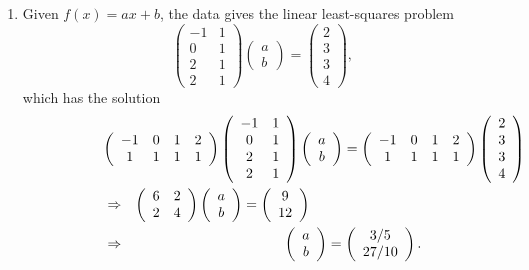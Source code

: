 \documentclass{article}
\begin{document}
\begin{enumerate}
\begin{enumerate}
\item Given \(f(x) = ax + b\), the data gives the linear least-squares problem
\[  \left( \begin{array}{cc} -1 & 1 \\ 0 & 1 \\ 2 & 1 \\ 2 & 1 \end{array} \right)
    \left( \begin{array}{c} a \\ b \end{array} \right)
  = \left( \begin{array}{c} 2 \\ 3 \\ 3 \\ 4 \end{array} \right),\]
which has the solution
\begin{eqnarray*}
\lefteqn{\left( \begin{array}{cccc} -1 & 0 & 1 & 2 \\ 1 & 1 & 1 & 1 \end{array} \right)
         \left( \begin{array}{cc} -1 & 1 \\ 0 & 1 \\ 2 & 1 \\ 2 & 1 \end{array} \right)
         \left( \begin{array}{c} a \\ b \end{array} \right)
       = \left( \begin{array}{cccc} -1 & 0 & 1 & 2 \\ 1 & 1 & 1 & 1 \end{array} \right)
         \left( \begin{array}{c} 2 \\ 3 \\ 3 \\ 4 \end{array} \right)} \\
& \Rightarrow & \left( \begin{array}{cc} 6 & 2 \\ 2 & 4 \end{array} \right)
                \left( \begin{array}{c} a \\ b \end{array} \right)
              = \left( \begin{array}{c} 9 \\ 12 \end{array} \right) \qquad \qquad \qquad \qquad \\
& \Rightarrow & \left( \begin{array}{c} a \\ b \end{array} \right)
              = \left( \begin{array}{c} 3/5 \\ 27/10 \end{array} \right).
\end{eqnarray*}


\end{enumerate}
\end{enumerate}
\end{document}
